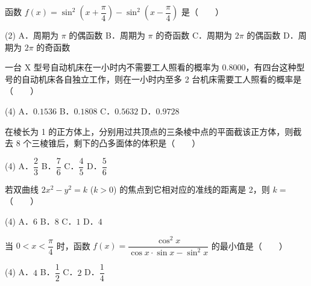 \begin{question}
函数 $f(x) = \sin^2\left(x + \dfrac{\pi}{4}\right) - \sin^2\left(x - \dfrac{\pi}{4}\right)$ 是\mbox{（　　）}

\begin{gkopts}(2)
\task A．周期为 $\pi$ 的偶函数
\task B．周期为 $\pi$ 的奇函数
\task C．周期为 $2\pi$ 的偶函数
\task D．周期为 $2\pi$ 的奇函数
\end{gkopts}

\end{question}
\begin{question}
一台 X 型号自动机床在一小时内不需要工人照看的概率为 $0.8000$，有四台这种型号的自动机床各自独立工作，则在一小时内至多 2 台机床需要工人照看的概率是\mbox{（　　）}

\begin{gkopts}(4)
\task A．$0.1536$
\task B．$0.1808$
\task C．$0.5632$
\task D．$0.9728$
\end{gkopts}

\end{question}
\begin{question}
在棱长为 1 的正方体上，分别用过共顶点的三条棱中点的平面截该正方体，则截去 8 个三棱锥后，剩下的凸多面体的体积是\mbox{（　　）}

\begin{gkopts}(4)
\task A．$\dfrac{2}{3}$
\task B．$\dfrac{7}{6}$
\task C．$\dfrac{4}{5}$
\task D．$\dfrac{5}{6}$
\end{gkopts}

\end{question}
\begin{question}
若双曲线 $2x^2 - y^2 = k$ ($k > 0$) 的焦点到它相对应的准线的距离是 2，则 $k =$\mbox{（　　）}

\begin{gkopts}(4)
\task A．$6$
\task B．$8$
\task C．$1$
\task D．$4$
\end{gkopts}

\end{question}
\begin{question}
当 $0 < x < \dfrac{\pi}{4}$ 时，函数 $f(x) = \dfrac{\cos^2 x}{\cos x \cdot \sin x - \sin^2 x}$ 的最小值是\mbox{（　　）}

\begin{gkopts}(4)
\task A．$4$
\task B．$\dfrac{1}{2}$
\task C．$2$
\task D．$\dfrac{1}{4}$
\end{gkopts}

\end{question}
